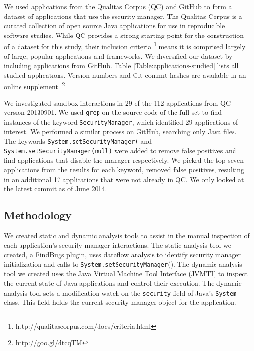 \documentclass{sig-alternate}
\begin{document}
We used applications from the Qualitas Corpus (QC)
\cite{QualitasCorpus:APSEC:2010} and GitHub to form a dataset of applications
that use the security manager.  The Qualitas Corpus is a curated collection of
open source Java applications for use in reproducible software studies.  While
QC provides a strong starting point for the construction of a dataset for this
study, their inclusion criteria%
\footnote{http://qualitascorpus.com/docs/criteria.html%
} means it is comprised largely of large, popular applications and frameworks.
We diversified our dataset by including applications from GitHub. Table
\ref{Table:applications-studied} lists all studied applications. Version numbers
and Git commit hashes are available in an online supplement.%
\footnote{http://goo.gl/dtcqTM%
} 

We investigated sandbox interactions in 29 of the 112 applications from QC
version 20130901.  We used \texttt{grep} on the source code of the full set
to find instances of the keyword \texttt{SecurityManager}, which
identified 29 applications of interest.  We performed a similar process on
GitHub, searching only Java files. The keywords
\texttt{System.setSecurityManager(} and \texttt{System.setSecurityManager(null)} were added to remove false positives and find applications that disable the
manager respectively. We picked the top seven applications from the results for each keyword,
removed false positives, resulting in an additional 17 applications that
were not already in QC. We only looked at the latest commit as of June 2014.

\subsection{Methodology}

We created static and dynamic analysis tools
to assist in the manual inspection of each application's security manager
interactions. The static analysis tool we created, a 
FindBugs \cite{hovemeyer_finding_2004} plugin,
uses dataflow analysis to identify security manager initialization and calls to \texttt{System.setSecurityManager}().
The dynamic analysis tool we created uses the Java Virtual Machine
Tool Interface (JVMTI) \cite{_jvmti}
to inspect the current state of Java applications and control
their execution. The dynamic analysis tool sets a modification watch
on the \texttt{security} field of Java's \texttt{System} class. This
field holds the current security manager object for the application.
\end{document}
